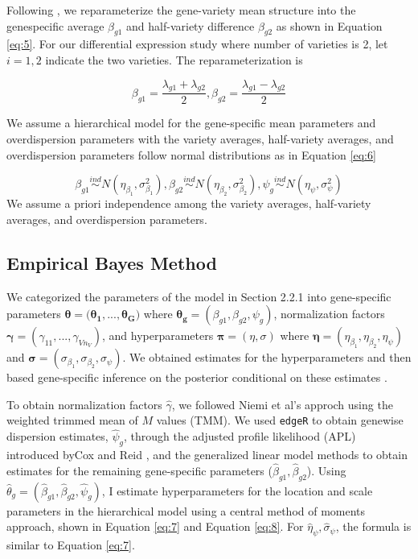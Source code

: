 Following \citep{ji2014estimation}, we reparameterize the gene-variety mean structure into the genespecific average $\beta_{g1}$ and half-variety difference $\beta_{g2}$ as shown in Equation \eqref{eq:5}. For our differential expression study where number of varieties is 2, let $i=1,2$ indicate the two varieties. The reparameterization is

\begin{equation}
\label{eq:5}
\beta_{g1} = \frac{\lambda_{g1}+\lambda_{g2}}{2}, \beta_{g2} = \frac{\lambda_{g1}-\lambda_{g2}}{2}
\end{equation}

We assume a hierarchical model for the gene-specific mean parameters and overdispersion parameters with the variety averages, half-variety averages, and overdispersion parameters follow normal distributions as in Equation \eqref{eq:6}

\begin{equation}
\label{eq:6}
\beta_{g1} \stackrel{ind}{\sim} N(\eta_{\beta_1}, \sigma^2_{\beta_1}), \beta_{g2} \stackrel{ind}{\sim} N(\eta_{\beta_2} , \sigma^2_{\beta_2}), \psi_g \stackrel{ind}{\sim} N(\eta_\psi, \sigma^2_\psi)
\end{equation}
We assume a priori independence among the variety averages, half-variety averages, and overdispersion parameters.


\subsection{Empirical Bayes Method}

We categorized the parameters of the model in Section 2.2.1 into gene-specific parameters $\mathbf{\theta} = (\mathbf{\theta_1}, ..., \mathbf{\theta_G)}$ where $\mathbf{\theta_g} = (\beta_{g1}, \beta_{g2}, \psi_g)$, normalization factors $\mathbf{\gamma} = (\gamma_{11}, ..., \gamma_{V n_V})$, and hyperparameters $\mathbf{\pi} = (\eta, \sigma)$ where $\mathbf{\eta} = (\eta_{\beta_1}, \eta_{\beta_2}, \eta_\psi)$ and $\mathbf{\sigma} = (\sigma_{\beta_1}, \sigma_{\beta_2}, \sigma_\psi)$. We obtained estimates for the hyperparameters and then based gene-specific inference on the posterior conditional on these estimates \citep{niemi2015empirical}.

To obtain normalization factors $\hat{\gamma}$, we followed Niemi et al's approch \citep{niemi2015empirical} using the weighted trimmed mean of $M$ values (TMM)\citep{robinson2010scaling}. We used {\tt edgeR} to obtain genewise dispersion estimates, $\hat{\psi}_g$, through the adjusted profile likelihood (APL) introduced byCox and Reid \citep{cox1987parameter}, and the generalized linear model methods to obtain estimates for the remaining gene-specific parameters ($\hat{\beta}_{g1}, \hat{\beta}_{g2}$)\citep{robinson2010scaling}. Using $\hat{\theta}_g = (\hat{\beta}_{g1} , \hat{\beta}_{g2}, \hat{\psi}_g)$, I estimate hyperparameters for the location and scale parameters in the hierarchical model using a central method of moments approach, shown in Equation \eqref{eq:7} and Equation \eqref{eq:8}. For $\hat{\eta}_{\psi}, \hat{\sigma}_{\psi}$, the formula is similar to Equation \eqref{eq:7}.

